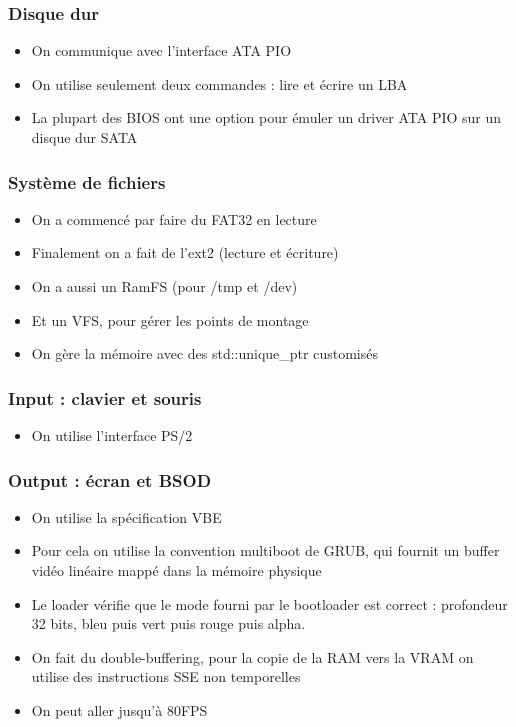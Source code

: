 \documentclass[aspectration=43]{beamer}
\begin{document}
\begin{frame}
    \frametitle{Disque dur}
    \begin{itemize}
        \item On communique avec l'interface ATA PIO
        \item On utilise seulement deux commandes : lire et écrire un LBA
        \item La plupart des BIOS ont une option pour émuler un driver ATA PIO sur un disque dur SATA
    \end{itemize}
\end{frame}


\begin{frame}
    \frametitle{Système de fichiers}
    \begin{itemize}
        \item On a commencé par faire du FAT32 en lecture
        \item Finalement on a fait de l'ext2 (lecture et écriture)
        \item On a aussi un RamFS (pour /tmp et /dev)
        \item Et un VFS, pour gérer les points de montage
        \item On gère la mémoire avec des std::unique\_ptr customisés
    \end{itemize}
\end{frame}

\begin{frame}
    \frametitle{Input : clavier et souris}
    \begin{itemize}
        \item On utilise l'interface PS/2
    \end{itemize}
\end{frame}

\begin{frame}
    \frametitle{Output : écran et BSOD}
    \begin{itemize}
        \item On utilise la spécification VBE
        \item Pour cela on utilise la convention multiboot de GRUB, qui fournit un buffer vidéo linéaire mappé dans la mémoire physique
        \item Le loader vérifie que le mode fourni par le bootloader est correct : profondeur 32 bits, bleu puis vert puis rouge puis alpha.
        \item On fait du double-buffering, pour la copie de la RAM vers la VRAM on utilise des instructions SSE non temporelles
        \item On peut aller jusqu'à 80FPS
    \end{itemize}
\end{frame}
\end{document}
